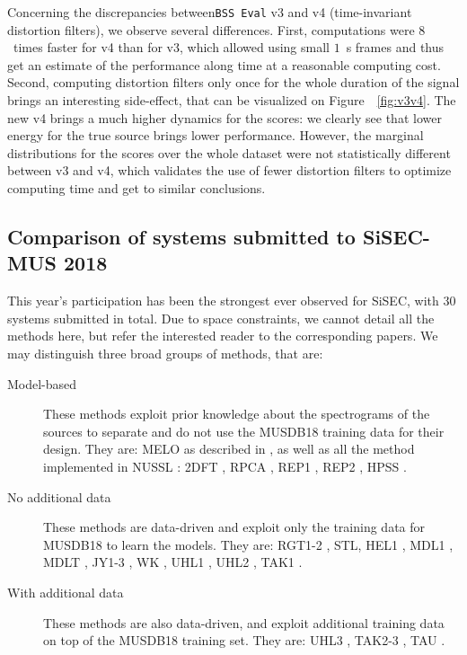 \documentclass{llncs}
\begin{document}
Concerning the discrepancies between\texttt{BSS~Eval} v3 and v4 (time-invariant distortion filters), we observe several differences. First, computations were $8$~times faster for v4 than for v3, which allowed using small $1$~s frames and thus get an estimate of the performance along time at a reasonable computing cost. Second, computing distortion filters only once for the whole duration of the signal brings an interesting side-effect, that can be visualized on Figure~~\ref{fig:v3v4}. The new v4 brings a much higher dynamics for the scores: we clearly see that lower energy for the true source brings lower performance. However, the marginal distributions for the scores over the whole dataset were not statistically different between v3 and v4, which validates the use of fewer distortion filters to optimize computing time and get to similar conclusions.

\subsection{Comparison of systems submitted to SiSEC-MUS 2018}
This year's participation has been the strongest ever observed for SiSEC, with $30$ systems submitted in total. Due to space constraints, we cannot detail all the methods here, but refer the interested reader to the corresponding papers. We may distinguish three broad groups of methods, that are:
\begin{description}
  \item[Model-based] These methods exploit prior knowledge about the spectrograms of the sources to separate and do not use the MUSDB18 training data for their design. They are: MELO as described in \cite{MELO}, as well as all the method implemented in NUSSL \cite{NUSSL}: 2DFT \cite{2DFT}, RPCA \cite{RPCA}, REP1 \cite{REP1}, REP2 \cite{REP2}, HPSS \cite{HPSS}.
  \item[No additional data] These methods are data-driven and exploit only the
  training data for MUSDB18 to learn the models. They are: RGT1-2 \cite{RGT1}, STL, HEL1 \cite{HEL1}, MDL1 \cite{MDL1}, MDLT \cite{MDLT}, JY1-3 \cite{JY1}, WK \cite{WK}, UHL1 \cite{UHL1}, UHL2 \cite{UHL2}, TAK1 \cite{TAK1}.
  \item[With additional data] These methods are also data-driven, and exploit additional training data on top of the MUSDB18 training set. They are: UHL3 \cite{UHL2}, TAK2-3 \cite{TAK1}, TAU \cite{TAK1,UHL2}.
\end{description}
\end{document}
